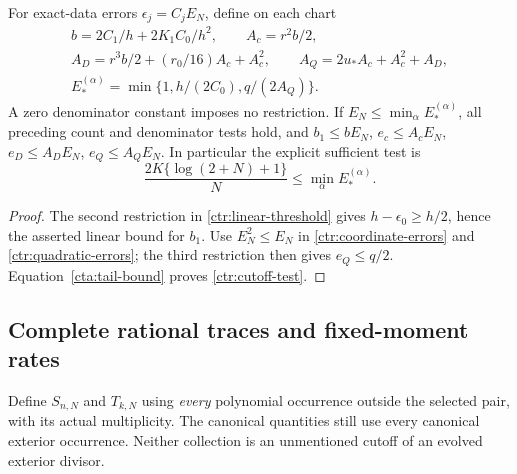 \begin{corollary}
\label{ctr:threshold}
For exact-data errors $\epsilon_j=C_jE_N$, define on each chart
\begin{equation}
 \begin{gathered}
 b=2C_1/h+2K_1C_0/h^2,\qquad A_c=r^2b/2,\\
 A_D=r^3b/2+(r_0/16)A_c+A_c^2,\qquad
 A_Q=2u_*A_c+A_c^2+A_D,\\
 E_*^{(\alpha)}=\min\{1,h/(2C_0),q/(2A_Q)\}.
 \end{gathered}
 \label{ctr:linear-threshold}
\end{equation}
A zero denominator constant imposes no restriction. If
$E_N\le\min_\alpha E_*^{(\alpha)}$, all preceding count and
denominator tests hold, and $b_1\le bE_N$, $e_c\le A_cE_N$,
$e_D\le A_DE_N$, $e_Q\le A_QE_N$. In particular the explicit
sufficient test is
\begin{equation}
 \frac{2K\{\log(2+N)+1\}}N\le\min_\alpha E_*^{(\alpha)}.
 \label{ctr:cutoff-test}
\end{equation}
\end{corollary}

\begin{proof}
The second restriction in \eqref{ctr:linear-threshold} gives
$h-\epsilon_0\ge h/2$, hence the asserted linear bound for $b_1$.
Use $E_N^2\le E_N$ in \eqref{ctr:coordinate-errors} and
\eqref{ctr:quadratic-errors}; the third restriction then gives
$e_Q\le q/2$. Equation~\eqref{cta:tail-bound} proves
\eqref{ctr:cutoff-test}.
\end{proof}

\subsection{Complete rational traces and fixed-moment rates}

Define $S_{n,N}$ and $T_{k,N}$ using \emph{every} polynomial occurrence
outside the selected pair, with its actual multiplicity. The canonical
quantities still use every canonical exterior occurrence. Neither
collection is an unmentioned cutoff of an evolved exterior divisor.


